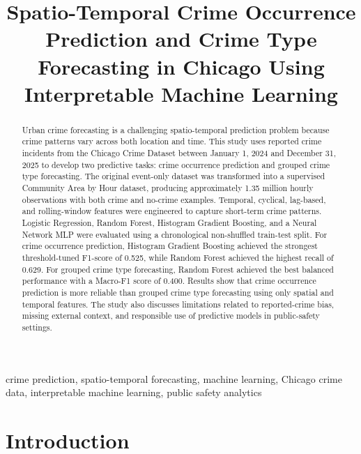 \documentclass[conference]{IEEEtran}
\begin{document}
\title{Spatio-Temporal Crime Occurrence Prediction and Crime Type Forecasting in Chicago Using Interpretable Machine Learning}

\author{
}

\maketitle

\begin{abstract}
Urban crime forecasting is a challenging spatio-temporal prediction problem because crime patterns vary across both location and time. This study uses reported crime incidents from the Chicago Crime Dataset between January 1, 2024 and December 31, 2025 to develop two predictive tasks: crime occurrence prediction and grouped crime type forecasting. The original event-only dataset was transformed into a supervised Community Area by Hour dataset, producing approximately 1.35 million hourly observations with both crime and no-crime examples. Temporal, cyclical, lag-based, and rolling-window features were engineered to capture short-term crime patterns. Logistic Regression, Random Forest, Histogram Gradient Boosting, and a Neural Network MLP were evaluated using a chronological non-shuffled train-test split. For crime occurrence prediction, Histogram Gradient Boosting achieved the strongest threshold-tuned F1-score of 0.525, while Random Forest achieved the highest recall of 0.629. For grouped crime type forecasting, Random Forest achieved the best balanced performance with a Macro-F1 score of 0.400. Results show that crime occurrence prediction is more reliable than grouped crime type forecasting using only spatial and temporal features. The study also discusses limitations related to reported-crime bias, missing external context, and responsible use of predictive models in public-safety settings.
\end{abstract}

\begin{IEEEkeywords}
crime prediction, spatio-temporal forecasting, machine learning, Chicago crime data, interpretable machine learning, public safety analytics
\end{IEEEkeywords}

\section{Introduction}
\end{document}
